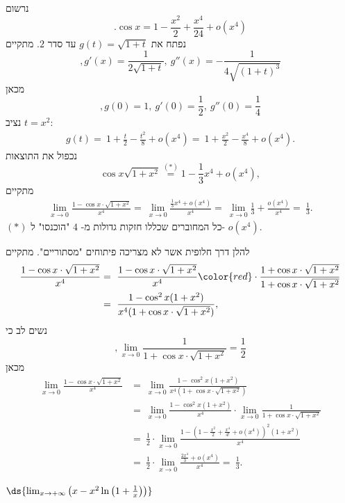 \begin{solbox}
נרשום
\[
.\cos x=1-\frac{x^2}{2}+\frac{x^4}{24}+o(x^4)
\]
נפתח את
$g(t)=\sqrt{1+t}$
עד סדר
$2$.
מתקיים
$$,g'(x)=\frac{1}{2\sqrt{1+t}},\ g''(x)=-\frac{1}{4\sqrt{(1+t)^3}}$$
מכאן
$$,g(0)=1,\ g'(0)=\frac{1}{2},\ g''(0)=\frac{1}{4}$$
נציב
$t=x^2$:
\begin{align*}
    g(t)=\ 1+\frac{t}{2}-\frac{t^2}{8}+o(x^4)
    =\ 1+\frac{x^2}{2}-\frac{x^4}{8}+o(x^4).
\end{align*}
נכפול את התוצאות
\[
\cos x\sqrt{1+x^2}\overset{(\ast)}{=}1-\frac{1}{3}x^4+o(x^4),
\]
מתקיים
\begin{align*}
    \lim_{x \to 0} \frac{1 - \cos x \cdot \sqrt{1 + x^2}}{x^4}=\ \lim_{x \to 0} \frac{\frac{1}{3}x^4+o(x^4)}{x^4}
    =\ \lim_{x \to 0}\frac{1}{3}+\frac{o(x^4)}{x^4}
    =\ \frac{1}{3}.
\end{align*}
$(\ast)$ כל המחוברים שכללו חזקות גדולות מ-
$4$
"הוכנסו" ל-
$o(x^4)$.

להלן דרך חלופית אשר לא מצריכה פיתוחים "מסתוריים".
מתקיים
\begin{align*}
    \frac{1 - \cos x \cdot \sqrt{1 + x^2}}{x^4}&=\ \frac{1 - \cos x \cdot \sqrt{1 + x^2}}{x^4}{\color{red}\cdot\frac{1+\cos x\cdot\sqrt{1+x^2}}{1+\cos x\cdot\sqrt{1+x^2}}}\\
    &=\ \frac{1-\cos^2x(1+x^2)}{x^4(1+\cos x\cdot\sqrt{1+x^2})},
\end{align*}
נשים לב כי
$$,\lim_{x\to0}\frac{1}{1+\cos x\cdot\sqrt{1+x^2}}=\frac{1}{2}$$
מכאן
\begin{align*}
    \lim_{x\to0}\frac{1 - \cos x \cdot \sqrt{1 + x^2}}{x^4}&=\ \lim_{x\to0}\frac{1-\cos^2x(1+x^2)}{x^4(1+\cos x\cdot\sqrt{1+x^2})}\\
    &=\ \lim_{x\to0}\frac{1-\cos^2x(1+x^2)}{x^4}\cdot\lim_{x\to0}\frac{1}{1+\cos x\cdot\sqrt{1+x^2}}\\
    &=\ \frac{1}{2}\cdot\lim_{x\to0}\frac{1-\left(1-\frac{x^2}{2}+\frac{x^4}{4!}+o(x^4)\right)^2(1+x^2)}{x^4}\\
    &=\ \frac{1}{2}\cdot\lim_{x\to0}\frac{\frac{2x^4}{3}+o(x^4)}{x^4}
    =\ \frac{1}{3}.
\end{align*}
\end{solbox}
\item $\ds{\lim_{x \to +\infty} \left( x - x^2 \ln\left(1 + \frac{1}{x}\right) \right)}$
